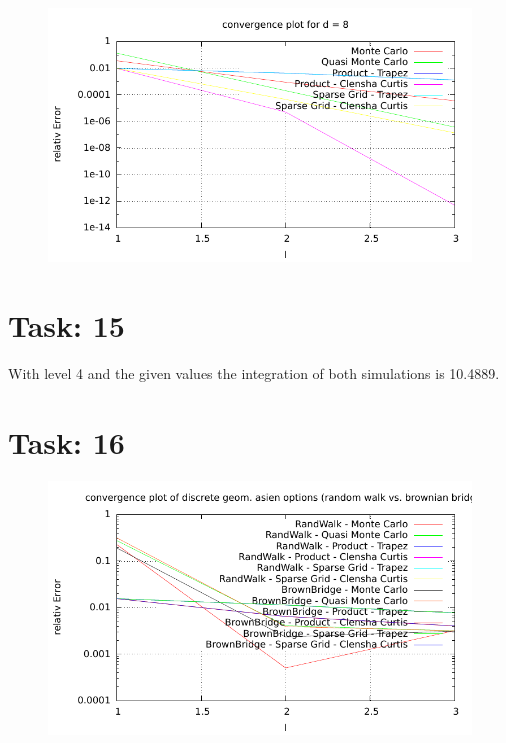 \documentclass{article}
\begin{document}
\begin{figure}[htbp]
  \centering
     \includegraphics[width=1.0\textwidth]{../Task13/sh3_task13_convergencePlotd8.pdf}
\end{figure}

\section*{Task: 15}

With level 4 and the given values the integration of both simulations is 10.4889.

\section*{Task: 16}

\begin{figure}[htbp]
  \centering
     \includegraphics[width=1.0\textwidth]{../Task16/sh3_task16_convergence_plot.pdf}
\end{figure}
\end{document}
